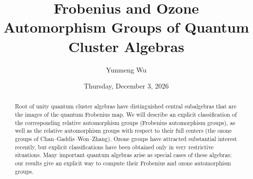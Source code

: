 \documentclass{UAmathtalk}
\author{Yunmeng Wu}
\title{Frobenius and Ozone Automorphism Groups of Quantum Cluster Algebras}
\date{Thursday, December 3, 2026}
\begin{document}
\maketitle

\begin{abstract}
Root of unity quantum cluster algebras have distinguished central subalgebras that are the images of the quantum Frobenius map. We will describe an explicit classification of the corresponding relative automorphism groups (Frobenius automorphism groups), as well as the relative automorphism groups with respect to their full centers (the ozone groups of Chan–Gaddis–Won–Zhang). Ozone groups have attracted substantial interest recently, but explicit classifications have been obtained only in very restrictive situations. Many important quantum algebras arise as special cases of these algebras; our results give an explicit way to compute their Frobenius and ozone automorphism groups.
\end{abstract}
\end{document}
